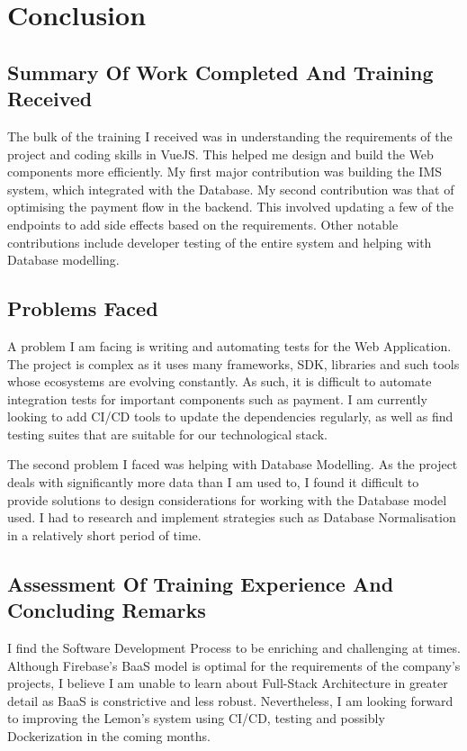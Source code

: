 \section{Conclusion}
\subsection{Summary Of Work Completed And Training Received}
\noindent
The bulk of the training I received was in understanding the requirements of the project and coding skills in VueJS. This helped
me design and build the Web components more efficiently.
\noindent
My first major contribution was building the IMS system, which integrated with the Database.
\noindent
My second contribution was that of optimising the payment flow in the backend. This involved updating a few of the endpoints to add side effects based on the requirements.
\noindent
Other notable contributions include developer testing of the entire system and helping with Database modelling.
 
\subsection{Problems Faced}
\noindent
A problem I am facing is writing and automating tests for the Web Application. The project is complex as it uses many frameworks, SDK, libraries
and such tools whose ecosystems are evolving constantly. As such, it is difficult to automate integration tests for important components such as
payment. I am currently looking to add CI/CD tools to update the dependencies regularly, as well as find testing suites that
are suitable for our technological stack.

\noindent
The second problem I faced was helping with Database Modelling. As the project deals with significantly more data than
I am used to, I found it difficult to provide solutions to design considerations for working with the Database model used. I had to 
research and implement strategies such as Database Normalisation in a relatively short period of time.

\subsection{Assessment Of Training Experience And Concluding Remarks}
\noindent
I find the Software Development Process to be enriching and challenging at times. Although Firebase's BaaS model is optimal for 
the requirements of the company's projects, I believe I am unable to learn about Full-Stack Architecture in greater detail as BaaS is constrictive and less robust.
Nevertheless, I am looking forward to improving the Lemon's system using CI/CD, testing and possibly Dockerization in the coming months.
